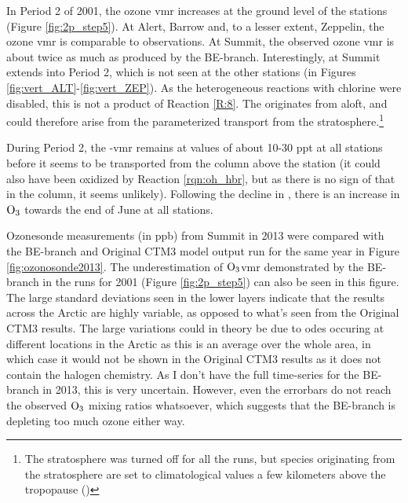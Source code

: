 \medskip

In Period 2 of 2001, the ozone \acrshort{vmr} increases at the ground level of the stations (Figure \ref{fig:2p_step5}). At Alert, Barrow and, to a lesser extent, Zeppelin, the ozone \acrshort{vmr} is comparable to observations. At Summit, the observed ozone \acrshort{vmr} is about twice as much as produced by the BE-branch. Interestingly,  at Summit extends into Period 2, which is not seen at the other stations (in Figures \ref{fig:vert_ALT}-\ref{fig:vert_ZEP}). As the heterogeneous reactions with chlorine were disabled, this is not a product of Reaction \ref{R:8}. The  originates from aloft, and could therefore arise from the parameterized transport from the stratosphere.\footnote{The stratosphere was turned off for all the runs, but species originating from the stratosphere are set to climatological values a few kilometers above the tropopause (\cite{Sovde2012})} 

\medskip

During Period 2, the -\acrshort{vmr} remains at values of about 10-30 ppt at all stations before it seems to be transported from the column above the station (it could also have been oxidized by Reaction \ref{rqn:oh_hbr}, but as there is no sign of that in the  column, it seems unlikely). Following the decline in , there is an increase in $\mathrm{O_3}$ towards the end of June at all stations. 

\medskip

Ozonesonde measurements (in ppb) from Summit in 2013  were compared with the BE-branch and Original CTM3 model output run for the same year in Figure \ref{fig:ozonosonde2013}. The underestimation of $\mathrm{O_3}$\acrshort{vmr} demonstrated by the BE-branch in the runs for 2001 (Figure \ref{fig:2p_step5}) can also be seen in this figure. The large standard deviations seen in the lower layers indicate that the results across the Arctic are highly variable, as opposed to what's seen from the Original CTM3 results. The large variations could in theory be due to \acrshort{ode}s occuring at different locations in the Arctic as this is an average over the whole area, in which case it would not be shown in the Original CTM3 results as it does not contain the halogen chemistry. As I don't have the full time-series for the BE-branch in 2013, this is very uncertain. However, even the errorbars do not reach the observed $\mathrm{O_3}$ mixing ratios whatsoever, which suggests that the BE-branch is depleting too much ozone either way.


